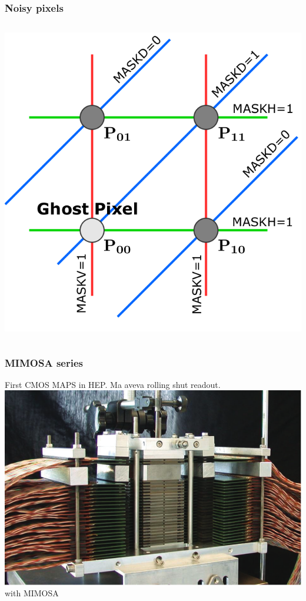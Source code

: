     \begin{frame}[noframenumbering]
        \frametitle{Noisy pixels}
        \begin{columns}
                \centering
                \includegraphics[width=.8\linewidth]{figures/Monopix1/masking_scheme.png}        
        \end{columns}
    \end{frame}    


    \begin{frame}[noframenumbering]
        \frametitle{MIMOSA series}
        First CMOS MAPS in HEP. Ma aveva rolling shut readout. 
        \includegraphics[width=.45\linewidth]{figures/pixel_detectors_usage/ALICE_FoCAL.png} with MIMOSA
    \end{frame} 



